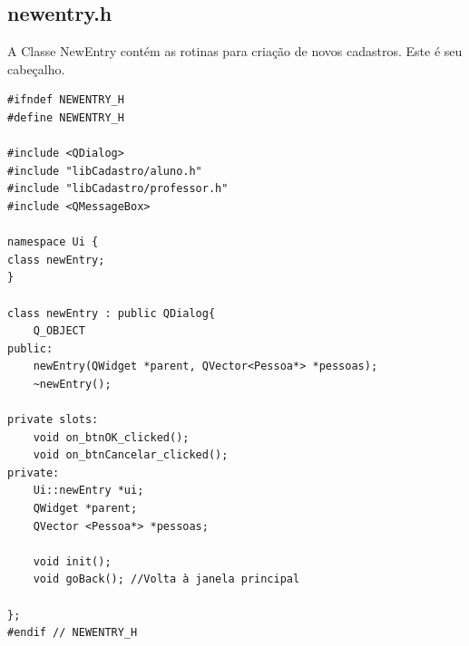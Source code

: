 \documentclass[12pt,a4paper]{article}
\begin{document}
\subsection*{newentry.h}
A Classe NewEntry contém as rotinas para criação de novos cadastros. Este é seu cabeçalho.
\begin{verbatim}
#ifndef NEWENTRY_H
#define NEWENTRY_H

#include <QDialog>
#include "libCadastro/aluno.h"
#include "libCadastro/professor.h"
#include <QMessageBox>

namespace Ui {
class newEntry;
}

class newEntry : public QDialog{
    Q_OBJECT
public:
    newEntry(QWidget *parent, QVector<Pessoa*> *pessoas);
    ~newEntry();

private slots:
    void on_btnOK_clicked();
    void on_btnCancelar_clicked();
private:
    Ui::newEntry *ui;
    QWidget *parent;
    QVector <Pessoa*> *pessoas;

    void init();
    void goBack(); //Volta à janela principal

};
#endif // NEWENTRY_H
\end{verbatim}
\end{document}
